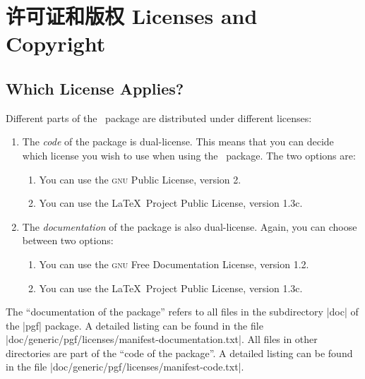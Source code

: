 %
%
%


\section{许可证和版权 Licenses and Copyright}
\label{section-license}

\subsection{Which License Applies?}

Different parts of the \pgfname\ package are distributed under different
licenses:
%
\begin{enumerate}
    \item The \emph{code} of the package is dual-license. This means that you
        can decide which license you wish to use when using the \pgfname\
        package. The two options are:
        \begin{enumerate}
            \item You can use the \textsc{gnu} Public License, version 2.
            \item You can use the \LaTeX\ Project Public License, version
                1.3c.
        \end{enumerate}
    \item The \emph{documentation} of the package is also dual-license.
        Again, you can choose between two options:
        \begin{enumerate}
            \item You can use the \textsc{gnu} Free Documentation License,
                version 1.2.
            \item You can use the \LaTeX\ Project Public License, version
                1.3c.
        \end{enumerate}
\end{enumerate}

The ``documentation of the package'' refers to all files in the subdirectory
|doc| of the |pgf| package. A detailed listing can be found in the file
|doc/generic/pgf/licenses/manifest-documentation.txt|. All files in other
directories are part of the ``code of the package''. A detailed listing can be
found in the file |doc/generic/pgf/licenses/manifest-code.txt|.

